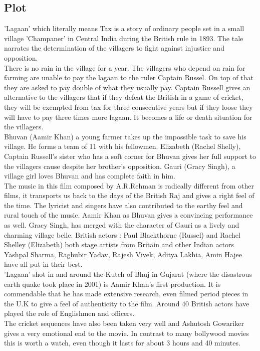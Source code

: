 \documentclass[a4paper]{article}
\begin{document}
	  \subsection{Plot }
	  'Lagaan' which literally means Tax is a story of ordinary people set in a small village 'Champaner' in Central India during the British rule in 1893. The tale narrates the determination of the villagers to fight against injustice and opposition.
	  \\
	  There is no rain in the village for a year. The villagers who depend on rain for farming are unable to pay the lagaan to the ruler Captain Russel. On top of that they are asked to pay double of what they usually pay. Captain Russell gives an alternative to the villagers that if they defeat the British in a game of cricket, they will be exempted from tax for three consecutive years but if they loose they will have to pay three times more lagaan. It becomes a life or death situation for the villagers.
\\	  
	  Bhuvan (Aamir Khan) a young farmer takes up the impossible task to save his village. He forms a team of 11 with his fellowmen. Elizabeth (Rachel Shelly), Captain Russell's sister who has a soft corner for Bhuvan gives her full support to the villagers cause despite her brother's opposition. Gauri (Gracy Singh), a village girl loves Bhuvan and has complete faith in him.
\\
The music in this film composed by A.R.Rehman is radically different from other films, it transports us back to the days of the British Raj and gives a right feel of the time. The lyricist and singers have also contributed to the earthy feel and rural touch of the music. Aamir Khan as Bhuvan gives a convincing performance as well. Gracy Singh, has merged with the character of Gauri as a lively and charming village belle. British actors : Paul Blackthorne (Russel) and Rachel Shelley (Elizabeth) both stage artists from Britain and other Indian actors Yashpal Sharma, Raghubir Yadav, Rajesh Vivek, Aditya Lakhia, Amin Hajee have all put in their best.
\\
'Lagaan' shot in and around the Kutch of Bhuj in Gujarat (where the disastrous earth quake took place in 2001) is Aamir Khan's first production. It is commendable that he has made extensive research, even filmed period pieces in the U.K to give a feel of authenticity to the film. Around 40 British actors have played the role of Englishmen and officers.
\\
The cricket sequences have also been taken very well and Ashutosh Gowariker gives a very emotional end to the movie. In contrast to many bollywood movies this is worth a watch, even though it lasts for about 3 hours and 40 minutes.
	  
\end{document}
